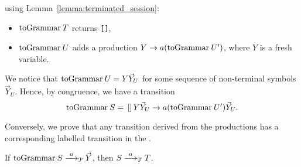 \begin{itemizeproof}
\begin{itemize}
  using Lemma~\ref{lemma:terminated_session}:
  \begin{itemize}
  \item $\toGrammarf T$  returns \lstinline{[]},
  \item $\toGrammarf U$ adds a production
    $Y \rightarrow a (\toGrammarf U')$, where $Y$ is a fresh
    variable.
  \end{itemize}
  We notice that $\toGrammarf U = Y\vec Y_U$ for some sequence of
  non-terminal symbols $\vec Y_U$. Hence, by congruence, we have a
  transition
  \[\toGrammarf S = \text{\lstinline{[]}} Y
    \vec Y_U \rightarrow a (\toGrammarf{U')} \vec Y_U.\]
\end{itemize}
\end{itemizeproof}

Conversely, we prove that any transition derived from the productions
has a corresponding labelled transition in the \LTS.

\begin{lemma}
  If $\toGrammarf S \LTSderivesP \vec Y$, then $S\stackrel{a}{\longrightarrow}_\mathcal T
  T$.\\ 
\end{lemma}

